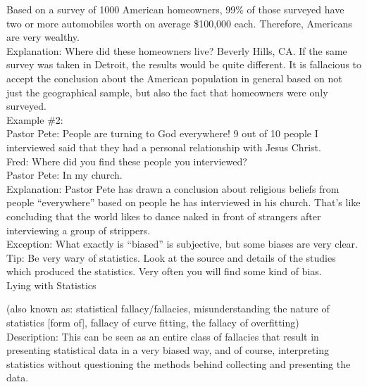 \documentclass[a4paper,12pt,single,pdftex]{scrartcl}
\begin{document}
    
      Based on a survey of 1000 American homeowners, 99\% of those surveyed have two or more automobiles worth on average \$100,000 each.  Therefore, Americans are very wealthy.
    \\

    
      Explanation: Where did these homeowners live?  Beverly Hills, CA.  If the same survey was taken in Detroit, the results would be quite different.  It is fallacious to accept the conclusion about the American population in general based on not just the geographical sample, but also the fact that homeowners were only surveyed.
    \\

    
      Example \#2:
    \\

    
      Pastor Pete: People are turning to God everywhere!  9 out of 10 people I interviewed said that they had a personal relationship with Jesus Christ.
    \\

    
      Fred: Where did you find these people you interviewed?
    \\

    
      Pastor Pete: In my church.
    \\

    
      Explanation: Pastor Pete has drawn a conclusion about religious beliefs from people “everywhere” based on people he has interviewed in his church.  That’s like concluding that the world likes to dance naked in front of strangers after interviewing a group of strippers.
    \\

    
      Exception: What exactly is “biased” is subjective, but some biases are very clear.
    \\

    
      Tip: Be very wary of statistics.  Look at the source and details of the studies which produced the statistics.  Very often you will find some kind of bias.
    \\

  

Lying with Statistics
    
      (also known as: statistical fallacy/fallacies, misunderstanding the nature of statistics [form of], fallacy of curve fitting, the fallacy of overfitting)
    \\

  
    Description: This can be seen as an entire class of fallacies that result in presenting statistical data in a very biased way, and of course, interpreting statistics without questioning the methods behind collecting and presenting the data.
\end{document}
